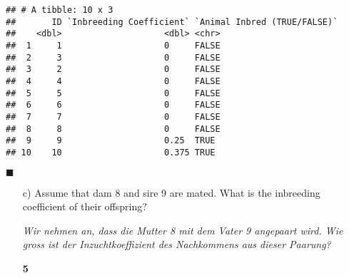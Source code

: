 \documentclass[
]{article}
\newenvironment{Shaded}{\begin{snugshade}}{\end{snugshade}}
\newcommand{\CommentTok}[1]{\textcolor[rgb]{0.56,0.35,0.01}{\textit{#1}}}
\newcommand{\DataTypeTok}[1]{\textcolor[rgb]{0.13,0.29,0.53}{#1}}
\newcommand{\DecValTok}[1]{\textcolor[rgb]{0.00,0.00,0.81}{#1}}
\newcommand{\KeywordTok}[1]{\textcolor[rgb]{0.13,0.29,0.53}{\textbf{#1}}}
\newcommand{\NormalTok}[1]{#1}
\newcommand{\OperatorTok}[1]{\textcolor[rgb]{0.81,0.36,0.00}{\textbf{#1}}}
\newcommand{\StringTok}[1]{\textcolor[rgb]{0.31,0.60,0.02}{#1}}
\newcommand{\points}[1]
{\begin{flushright}\textbf{#1}\end{flushright}}
\newcommand{\solend}
{\vspace{2ex}$\blacksquare$}
\begin{document}
\begin{Shaded}
\end{Shaded}

\begin{verbatim}
## # A tibble: 10 x 3
##       ID `Inbreeding Coefficient` `Animal Inbred (TRUE/FALSE)`
##    <dbl>                    <dbl> <chr>                       
##  1     1                    0     FALSE                       
##  2     3                    0     FALSE                       
##  3     2                    0     FALSE                       
##  4     4                    0     FALSE                       
##  5     5                    0     FALSE                       
##  6     6                    0     FALSE                       
##  7     7                    0     FALSE                       
##  8     8                    0     FALSE                       
##  9     9                    0.25  TRUE                        
## 10    10                    0.375 TRUE
\end{verbatim}

\solend

\clearpage
\pagebreak

\begin{enumerate}
\item[c)] Assume that dam 8 and sire 9 are mated. What is the inbreeding coefficient of their offspring?   

\textit{Wir nehmen an, dass die Mutter 8 mit dem Vater 9 angepaart wird. Wie gross ist der Inzuchtkoeffizient des Nachkommens aus dieser Paarung?}
\points{5}
\end{enumerate}
\end{document}
